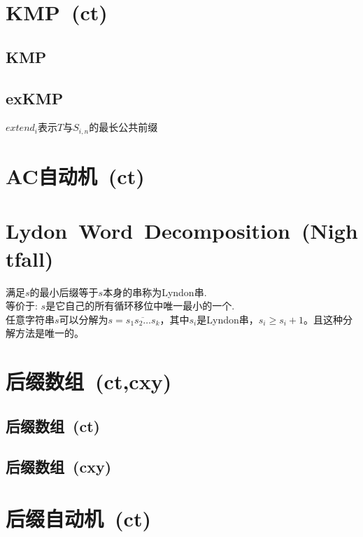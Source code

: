 \section{KMP\ \small(ct)}
    \subsection*{KMP}
    \subsection*{exKMP}
        $ extend_i $表示$ T $与$ S_{i,n} $的最长公共前缀

\section{AC自动机\ \small(ct)}

\section{Lydon\ Word\ Decomposition\ \small(Nightfall)}
    满足$ s $的最小后缀等于$ s $本身的串称为Lyndon串.
    \\等价于: $ s $是它自己的所有循环移位中唯一最小的一个.
    \\任意字符串$ s $可以分解为$ s = \overline{s_1 s_2 \dots s_k} $，其中$ s_i $是Lyndon串，$ s_i \geq s_i + 1 $。且这种分解方法是唯一的。

\section{后缀数组\ \small(ct,cxy)}
    \subsection*{后缀数组\ \small(ct)}
    \subsection*{后缀数组\ \small(cxy)}

\section{后缀自动机\ \small(ct)}

